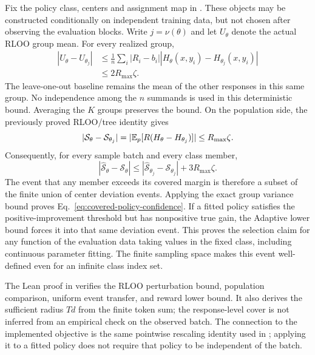 Fix the policy class, centers and assignment map in
. These objects may be constructed
conditionally on independent training data, but not chosen after observing
the evaluation blocks. Write $j=\nu(\theta)$ and let $U_\theta$ denote
the actual RLOO group mean. For every realized group,
\begin{align*}
    |U_\theta-U_{\theta_j}|
    &\le\frac1n\sum_i|R_i-b_i|
        |H_\theta(x,y_i)-H_{\theta_j}(x,y_i)|\\
    &\le2R_{\max}\zeta.
\end{align*}
The leave-one-out baseline remains the mean of the other responses in this
same group. No independence among the $n$ summands is used in this
deterministic bound. Averaging the $K$ groups preserves the bound. On the
population side, the previously proved RLOO/tree identity gives
\begin{equation*}
    |\mathcal S_\theta-\mathcal S_{\theta_j}|
      =|\mathbb{E}_p[R(H_\theta-H_{\theta_j})]|
      \le R_{\max}\zeta.
\end{equation*}
Consequently, for every sample batch and every class member,
\begin{equation*}
    |\widehat{\mathcal S}_\theta-\mathcal S_\theta|
    \le|\widehat{\mathcal S}_{\theta_j}-\mathcal S_{\theta_j}|
          +3R_{\max}\zeta.
\end{equation*}
The event that any member exceeds its covered margin is therefore a subset
of the finite union of center deviation events. Applying the exact group
variance bound proves Eq.~\eqref{eq:covered-policy-confidence}.
If a fitted policy satisfies the positive-improvement threshold but has
nonpositive true gain, the Adaptive lower bound forces it into that same
deviation event. This proves the selection claim for any function of the
evaluation data taking values in the fixed class, including continuous
parameter fitting. The finite sampling space makes this event well-defined
even for an infinite class index set.

The Lean proof in  verifies the RLOO
perturbation bound, population comparison, uniform event transfer, and
reward lower bound. It also derives the sufficient radius $Td$ from the
finite token sum; the response-level cover is not inferred from an empirical
check on the observed batch. The connection to the implemented objective is
the same pointwise rescaling identity used in
; applying it to a fitted policy does
not require that policy to be independent of the batch.

